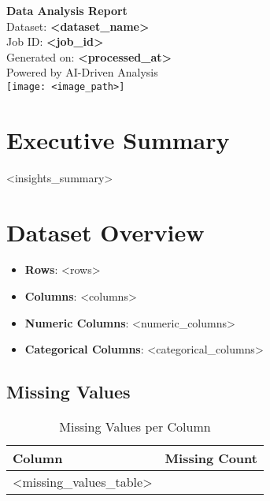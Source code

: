 \documentclass[a4paper,12pt]{article}
\begin{document}
\begin{titlepage}
    \centering
    \vspace*{1cm}
    \Huge
    \textbf{Data Analysis Report} \\
    \vspace{0.5cm}
    \Large
    Dataset: \textbf{<dataset_name>} \\
    \vspace{0.3cm}
    Job ID: \textbf{<job_id>} \\
    \vspace{0.3cm}
    Generated on: \textbf{<processed_at>} \\
    \vspace{1.5cm}
    \normalsize
    Powered by AI-Driven Analysis \\
    \vspace{0.5cm}
    \texttt{[image: <image\_path>]}
\end{titlepage}

\section{Executive Summary}
<insights_summary>

\section{Dataset Overview}
\begin{itemize}
    \item \textbf{Rows}: <rows>
    \item \textbf{Columns}: <columns>
    \item \textbf{Numeric Columns}: <numeric_columns>
    \item \textbf{Categorical Columns}: <categorical_columns>
\end{itemize}

\subsection{Missing Values}
\begin{table}[h]
    \centering
    \begin{tabular}{lc}
        \toprule
        \textbf{Column} & \textbf{Missing Count} \\
        \midrule
        <missing_values_table>
        \bottomrule
    \end{tabular}
    \caption{Missing Values per Column}
\end{table}
\end{document}
